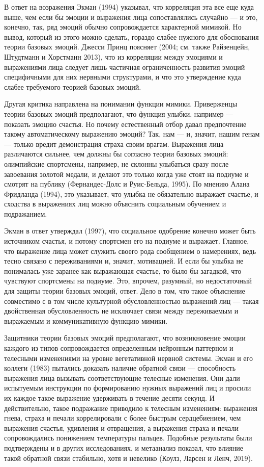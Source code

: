 \documentclass[11pt]{book}
\begin{document}
В ответ на возражения Экман (1994) указывал, что корреляция эта все еще куда выше, чем если бы эмоции и выражения лица сопоставлялись случайно --- и это, конечно, так, ряд эмоций обычно сопровождается характерной мимикой. Но вывод, который из этого можно сделать, гораздо слабее нужного для обоснования теории базовых эмоций. Джесси Принц поясняет (2004; см. также Райзенцейн, Штудтманн и Хорстманн 2013), что из корреляции между эмоциями и выражениями лица следует лишь частичная ограниченность развития эмоций специфичными для них нервными структурами, и что это утверждение куда слабее требуемого теорией базовых эмоций.

Другая критика направлена на понимании функции мимики. Приверженцы теории базовых эмоций предполагают, что функция улыбки, например --- показать эмоцию счастья. Но почему естественный отбор давал предпочтение такому автоматическому выражению эмоций? Так, нам --- и, значит, нашим генам --- только вредит демонстрация страха своим врагам. Выражения лица различаются сильнее, чем должны бы согласно теории базовых эмоций: олимпийские спортсмены, например, не склонны улыбаться сразу после завоевания золотой медали, и делают это только когда уже стоят на подиуме и смотрят на публику (Фернандес-Долс и Руис-Бельда, 1995). По мнению Алана Фридланда (1994), это указывает, что улыбка не обязательно выражает счастье, и сходства в выражениях лиц можно объяснить социальным обучением и подражанием.

Экман в ответ утверждал (1997), что социальное одобрение конечно может быть источником счастья, и потому спортсмен его на подиуме и выражает. Главное, что выражение лица может служить своего рода сообщением о намерениях, ведь тесно связано с переживаниями и, значит, мотивацией. И если бы улыбка не понималась уже заранее как выражающая счастье, то было бы загадкой, что чувствуют спортсмены на подиуме. Это, впрочем, разумный, но недостаточный для защиты теории базовых эмоций, ответ. Дело в том, что такое объяснение совместимо с в том числе культурной обусловленностью выражений лиц --- такая двойственная обусловленность не исключает связи между переживаемым и выражаемым и коммуникативную функцию мимики.

Защитники теории базовых эмоций предполагают, что возникновение эмоции каждого из типов сопровождается определенным нейронным паттерном и телесными изменениями на уровне вегетативной нервной системы. Экман и его коллеги (1983) пытались доказать наличие обратной связи --- способность выражения лица вызывать соответствующие телесные изменения. Они дали испытуемым инструкции по формированию нужных выражений лиц и просили их каждое такое выражение удерживать в течение десяти секунд. И действительно, такое подражание приводило к телесным изменениям: выражения гнева, страха и печали коррелировали с более быстрым сердцебиением, чем выражения счастья, удивления и отвращения, а выражения страха и печали сопровождались понижением температуры пальцев. Подобные результаты были подтверждены и в других исследованиях, и метаанализ показал, что влияние такой обратной связи стабильно, хотя и невелико (Коулз, Ларсен и Ленч, 2019).
\end{document}
